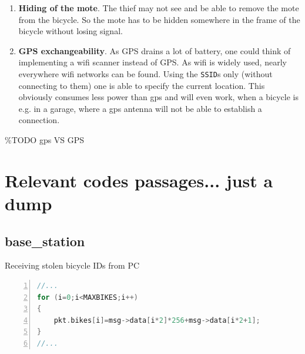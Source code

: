 \documentclass[a4paper]{article}
\begin{document}
\begin{enumerate}
\begin{enumerate}
\end{enumerate}
\item \textbf{Hiding of the mote}. The thief may not see and be able to remove the mote from the bicycle. So the mote has to be hidden somewhere in the frame of the bicycle without losing signal.
\item \textbf{GPS exchangeability}. As GPS drains a lot of battery, one could think of implementing a wifi scanner instead of GPS. As wifi is widely used, nearly everywhere wifi networks can be found. Using the \texttt{SSID}s only (without connecting to them) one is able to specify the current location. This obviously consumes less power than gps and will even work, when a bicycle is e.g. in a garage, where a gps antenna will not be able to establish a connection.
\end{enumerate}

\%TODO gps VS GPS

\section{Relevant codes passages... just a dump}
\subsection{base\_station}
Receiving stolen bicycle IDs from PC
\begin{lstlisting}[numbers=left, frame=single,language=C, captionpos=b, caption={DataMsg.h, content of packets}, label=lst:xxx]
//...
for (i=0;i<MAXBIKES;i++)
{
    pkt.bikes[i]=msg->data[i*2]*256+msg->data[i*2+1];
}
//...
\end{lstlisting}
\end{document}
